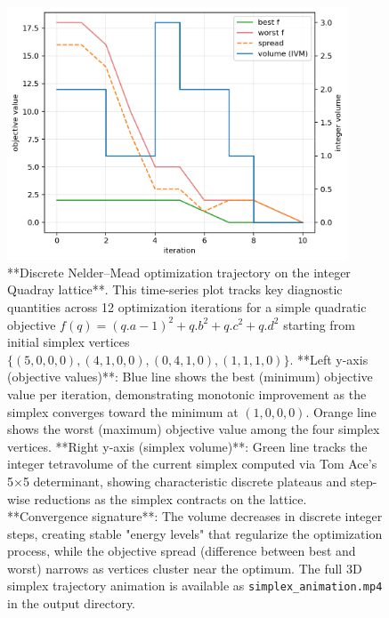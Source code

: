\documentclass[
  10pt,
]{article}
\begin{document}
\begin{figure}[htbp]
\centering
\includegraphics[width=0.9\textwidth]{figures/simplex_trace.png}
\caption{**Discrete Nelder–Mead optimization trajectory on the integer Quadray lattice**. This time-series plot tracks key diagnostic quantities across 12 optimization iterations for a simple quadratic objective $f(q) = (q.a - 1)^2 + q.b^2 + q.c^2 + q.d^2$ starting from initial simplex vertices $\{(5,0,0,0), (4,1,0,0), (0,4,1,0), (1,1,1,0)\}$. **Left y-axis (objective values)**: Blue line shows the best (minimum) objective value per iteration, demonstrating monotonic improvement as the simplex converges toward the minimum at $(1,0,0,0)$. Orange line shows the worst (maximum) objective value among the four simplex vertices. **Right y-axis (simplex volume)**: Green line tracks the integer tetravolume of the current simplex computed via Tom Ace's 5×5 determinant, showing characteristic discrete plateaus and step-wise reductions as the simplex contracts on the lattice. **Convergence signature**: The volume decreases in discrete integer steps, creating stable "energy levels" that regularize the optimization process, while the objective spread (difference between best and worst) narrows as vertices cluster near the optimum. The full 3D simplex trajectory animation is available as \texttt{simplex\_animation.mp4} in the output directory.}
\label{fig:simplex_trace}
\end{figure}
\end{document}
